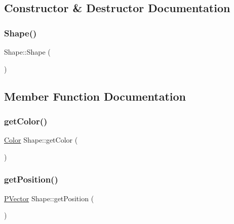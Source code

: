 \subsection{Constructor \& Destructor Documentation}
\hypertarget{class_shape_aaa8d87171e65e0d8ba3c5459978992a7}{}\label{class_shape_aaa8d87171e65e0d8ba3c5459978992a7} 
\subsubsection{\texorpdfstring{Shape()}{Shape()}}
{\footnotesize\ttfamily Shape\+::\+Shape (\begin{DoxyParamCaption}{ }\end{DoxyParamCaption})}



\subsection{Member Function Documentation}
\hypertarget{class_shape_ab20c5a85d59e7b9d0164158f4ad6c2a4}{}\label{class_shape_ab20c5a85d59e7b9d0164158f4ad6c2a4} 
\subsubsection{\texorpdfstring{get\+Color()}{getColor()}}
{\footnotesize\ttfamily \hyperlink{struct_color}{Color} Shape\+::get\+Color (\begin{DoxyParamCaption}{ }\end{DoxyParamCaption})}

\hypertarget{class_shape_a12f4452300d4321762fbf466e37190e0}{}\label{class_shape_a12f4452300d4321762fbf466e37190e0} 
\subsubsection{\texorpdfstring{get\+Position()}{getPosition()}}
{\footnotesize\ttfamily \hyperlink{struct_p_vector}{P\+Vector} Shape\+::get\+Position (\begin{DoxyParamCaption}{ }\end{DoxyParamCaption})}

\hypertarget{class_shape_aeabb7a6bd05635c30fa56e31766b09bc}{}\label{class_shape_aeabb7a6bd05635c30fa56e31766b09bc} 
